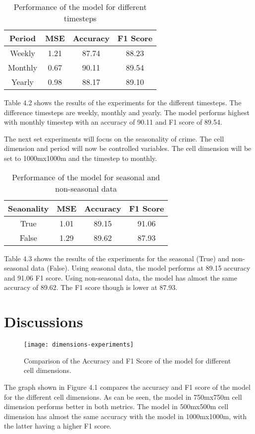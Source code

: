     \begin{table}[H]
      \centering
      \begin{tabular}{|c|c|c|c|}
            \hline
          \textbf{Period}  &\textbf{MSE}  &\textbf{Accuracy} &\textbf{F1 Score}\\ 
          \hline
          Weekly &1.21 &87.74 &88.23 \\
          Monthly &0.67 &90.11 &89.54 \\
          Yearly   &0.98 &88.17 &89.10 \\
          \hline
        \end{tabular}
      \caption{Performance of the model for different timesteps}
    \end{table}
    Table 4.2 shows the results of the experiments for the different timesteps. The difference timesteps are weekly, monthly and yearly. The model performs highest with monthly timestep with an accuracy of 90.11 and F1 score of 89.54.

    The next set experiments will focus on the seasonality of crime. The cell dimension and period will now be controlled variables. The cell dimension will be set to 1000mx1000m and the timestep to monthly.

    \begin{table}[H]
      \centering
      \begin{tabular}{|c|c|c|c|}
            \hline
          \textbf{Seaonality}  &\textbf{MSE}  &\textbf{Accuracy} &\textbf{F1 Score}\\ 
          \hline
          True &1.01 &89.15 &91.06\\
          False  &1.29 &89.62 &87.93 \\
          \hline
        \end{tabular}
      \caption{Performance of the model for seasonal and non-seasonal data}
    \end{table}
    Table 4.3 shows the results of the experiments for the seasonal (True) and non-seasonal data (False). Using seasonal data, the model performs at 89.15 accuracy and 91.06 F1 score. Using non-seasonal data, the model has almost the same accuracy of 89.62. The F1 score though is lower at 87.93.

\section{Discussions}

    \begin{figure}[H]
    \centering
    \texttt{[image: dimensions-experiments]}
    \caption{Comparison of the Accuracy and F1 Score of the model for different cell dimensions.}
    \end{figure}
    The graph shown in Figure 4.1 compares the accuracy and F1 score of the model for the different cell dimensions. As can be seen, the model in 750mx750m cell dimension performs better in both metrics. The model in 500mx500m cell dimension has almost the same accuracy with the model in 1000mx1000m, with the latter having a higher F1 score.

